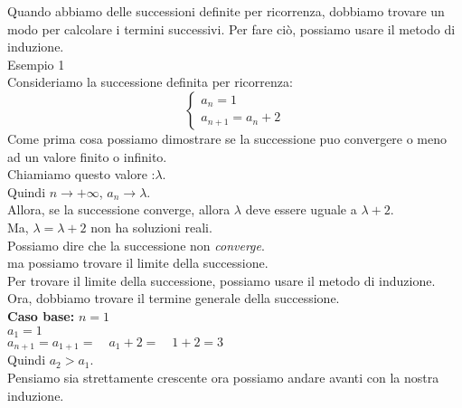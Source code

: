 Quando abbiamo delle successioni definite per ricorrenza, dobbiamo trovare un modo per calcolare i termini successivi. Per fare ciò, possiamo usare il metodo di induzione.\\
Esempio 1\\
Consideriamo la successione definita per ricorrenza:
\[ 
\left\{
\begin{array}{ll}
a_{n} = 1 \\
a_{n+1} = a_{n} + 2
\end{array}
\right.
\]
Come prima cosa possiamo dimostrare se la successione puo convergere o meno ad un valore finito o infinito.\\
Chiamiamo questo valore :$\lambda$.\\
Quindi $n \to +\infty$, $a_{n} \to \lambda$.\\
Allora, se la successione converge, allora $\lambda$ deve essere uguale a $\lambda + 2$.\\
Ma, $\lambda = \lambda + 2$ non ha soluzioni reali.\\
Possiamo dire che la successione non \emph{converge}.\\
ma possiamo trovare il limite della successione.\\
Per trovare il limite della successione, possiamo usare il metodo di induzione.\\
Ora, dobbiamo trovare il termine generale della successione.\\ 
\textbf{Caso base:} $n = 1$\\
$a_{1} = 1$
\\ $a_{n{+}1} = a_{1{+}1}=\quad a_{1} + 2 = \quad 1 + 2 = 3$\\
Quindi $a_{2} > a_{1}$. \\
Pensiamo sia strettamente crescente ora possiamo andare avanti con la nostra induzione.\\
